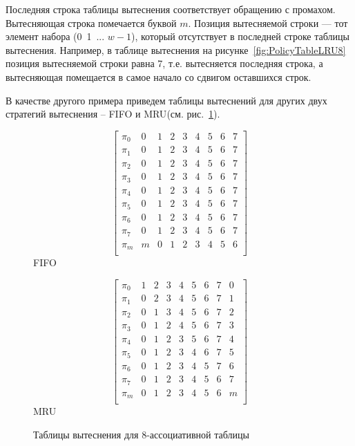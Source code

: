\documentclass[14pt]{extreport}
\newcommand{\FIFO}{\textsf{FIFO}\xspace}
\newcommand{\MRU}{\textsf{MRU}\xspace}
\begin{document}
Последняя строка таблицы вытеснения соответствует обращению с промахом. Вытесняющая строка помечается буквой $m$. Позиция вытесняемой строки --- тот элемент набора (0~1~... $w{-}1$), который отсутствует в последней строке таблицы вытеснения. Например, в таблице вытеснения на рисунке~\ref{fig:PolicyTableLRU8} позиция вытесняемой строки равна 7, т.е. вытесняется последняя строка, а вытесняющая помещается в самое начало со сдвигом оставшихся строк.

В качестве другого примера приведем таблицы вытеснений для других двух стратегий вытеснения -- \FIFO и \MRU (см. рис.~\ref{fig:fifo_mru_tables}).

\begin{figure}[h] \centering
\parbox{0.4\textwidth}{
$$ \left[
     \begin{array}{c|cccccccc}
       \pi_0 & 0 & 1 & 2 & 3 & 4 & 5 & 6 & 7 \\
       \pi_1 & 0 & 1 & 2 & 3 & 4 & 5 & 6 & 7 \\
       \pi_2 & 0 & 1 & 2 & 3 & 4 & 5 & 6 & 7 \\
       \pi_3 & 0 & 1 & 2 & 3 & 4 & 5 & 6 & 7 \\
       \pi_4 & 0 & 1 & 2 & 3 & 4 & 5 & 6 & 7 \\
       \pi_5 & 0 & 1 & 2 & 3 & 4 & 5 & 6 & 7 \\
       \pi_6 & 0 & 1 & 2 & 3 & 4 & 5 & 6 & 7 \\
       \pi_7 & 0 & 1 & 2 & 3 & 4 & 5 & 6 & 7 \\
       \pi_m & m & 0 & 1 & 2 & 3 & 4 & 5 & 6 \\
     \end{array}
   \right]$$
\center \FIFO} \qquad
\parbox{0.4\textwidth}{
$$ \left[
     \begin{array}{c|cccccccc}
       \pi_0 & 1 & 2 & 3 & 4 & 5 & 6 & 7 & 0 \\
       \pi_1 & 0 & 2 & 3 & 4 & 5 & 6 & 7 & 1 \\
       \pi_2 & 0 & 1 & 3 & 4 & 5 & 6 & 7 & 2 \\
       \pi_3 & 0 & 1 & 2 & 4 & 5 & 6 & 7 & 3 \\
       \pi_4 & 0 & 1 & 2 & 3 & 5 & 6 & 7 & 4 \\
       \pi_5 & 0 & 1 & 2 & 3 & 4 & 6 & 7 & 5 \\
       \pi_6 & 0 & 1 & 2 & 3 & 4 & 5 & 7 & 6 \\
       \pi_7 & 0 & 1 & 2 & 3 & 4 & 5 & 6 & 7 \\
       \pi_m & 0 & 1 & 2 & 3 & 4 & 5 & 6 & m \\
     \end{array}
   \right]$$
\center \MRU } \caption{Таблицы вытеснения для 8-ассоциативной таблицы}\label{fig:fifo_mru_tables}
\end{figure}
\end{document}
